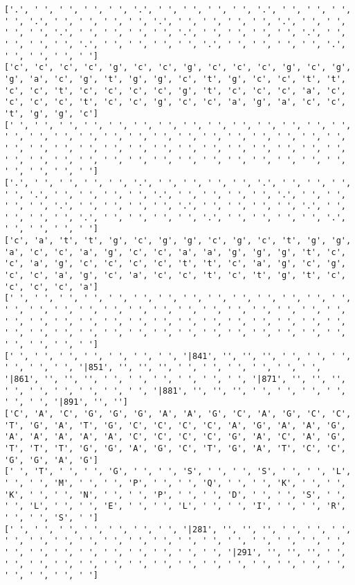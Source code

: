 \documentclass{article}
\begin{document}
\begin{Verbatim}
['.', ' ', ' ', ' ', ' ', '.', ' ', ' ', ' ', ' ', '.', ' ', ' ', ' ', ' ', '.', ' ', ' ', ' ', ' ', '.', ' ', ' ', ' ', ' ', '.', ' ', ' ', ' ', ' ', '.', ' ', ' ', ' ', ' ', '.', ' ', ' ', ' ', ' ', '.', ' ', ' ', ' ', ' ', '.', ' ', ' ', ' ', ' ', '.', ' ', ' ', ' ', ' ', '.', ' ', ' ', ' ', ' ']
['c', 'c', 'c', 'c', 'g', 'c', 'c', 'g', 'c', 'c', 'c', 'g', 'c', 'g', 'g', 'a', 'c', 'g', 't', 'g', 'g', 'c', 't', 'g', 'c', 'c', 't', 't', 'c', 'c', 't', 'c', 'c', 'c', 'c', 'g', 't', 'c', 'c', 'c', 'a', 'c', 'c', 'c', 'c', 't', 'c', 'c', 'g', 'c', 'c', 'a', 'g', 'a', 'c', 'c', 't', 'g', 'g', 'c']
[' ', ' ', ' ', ' ', ' ', ' ', ' ', ' ', ' ', ' ', ' ', ' ', ' ', ' ', ' ', ' ', ' ', ' ', ' ', ' ', ' ', ' ', ' ', ' ', ' ', ' ', ' ', ' ', ' ', ' ', ' ', ' ', ' ', ' ', ' ', ' ', ' ', ' ', ' ', ' ', ' ', ' ', ' ', ' ', ' ', ' ', ' ', ' ', ' ', ' ', ' ', ' ', ' ', ' ', ' ', ' ', ' ', ' ', ' ', ' ']
['.', ' ', ' ', ' ', ' ', '.', ' ', ' ', ' ', ' ', '.', ' ', ' ', ' ', ' ', '.', ' ', ' ', ' ', ' ', '.', ' ', ' ', ' ', ' ', '.', ' ', ' ', ' ', ' ', '.', ' ', ' ', ' ', ' ', '.', ' ', ' ', ' ', ' ', '.', ' ', ' ', ' ', ' ', '.', ' ', ' ', ' ', ' ', '.', ' ', ' ', ' ', ' ', '.', ' ', ' ', ' ', ' ']
['c', 'a', 't', 't', 'g', 'c', 'g', 'g', 'c', 'g', 'c', 't', 'g', 'g', 'a', 'c', 'c', 'a', 'g', 'c', 'c', 'a', 'a', 'g', 'g', 'g', 't', 'c', 'c', 'a', 'g', 'c', 'c', 'c', 'c', 't', 't', 'c', 'a', 'g', 'c', 'g', 'c', 'c', 'a', 'g', 'c', 'a', 'c', 'c', 't', 'c', 't', 'g', 't', 'c', 'c', 'c', 'c', 'a']
[' ', ' ', ' ', ' ', ' ', ' ', ' ', ' ', ' ', ' ', ' ', ' ', ' ', ' ', ' ', ' ', ' ', ' ', ' ', ' ', ' ', ' ', ' ', ' ', ' ', ' ', ' ', ' ', ' ', ' ', ' ', ' ', ' ', ' ', ' ', ' ', ' ', ' ', ' ', ' ', ' ', ' ', ' ', ' ', ' ', ' ', ' ', ' ', ' ', ' ', ' ', ' ', ' ', ' ', ' ', ' ', ' ', ' ', ' ', ' ']
[' ', ' ', ' ', ' ', ' ', ' ', ' ', '|841', '', '', '', ' ', ' ', ' ', ' ', ' ', ' ', '|851', '', '', '', ' ', ' ', ' ', ' ', ' ', ' ', '|861', '', '', '', ' ', ' ', ' ', ' ', ' ', ' ', '|871', '', '', '', ' ', ' ', ' ', ' ', ' ', ' ', '|881', '', '', '', ' ', ' ', ' ', ' ', ' ', ' ', '|891', '', '']
['C', 'A', 'C', 'G', 'G', 'G', 'A', 'A', 'G', 'C', 'A', 'G', 'C', 'C', 'T', 'G', 'A', 'T', 'G', 'C', 'C', 'C', 'C', 'A', 'G', 'A', 'A', 'G', 'A', 'A', 'A', 'A', 'A', 'C', 'C', 'C', 'C', 'G', 'A', 'C', 'A', 'G', 'T', 'T', 'T', 'G', 'G', 'A', 'G', 'C', 'T', 'G', 'A', 'T', 'C', 'C', 'G', 'G', 'A', 'G']
[' ', 'T', ' ', ' ', 'G', ' ', ' ', 'S', ' ', ' ', 'S', ' ', ' ', 'L', ' ', ' ', 'M', ' ', ' ', 'P', ' ', ' ', 'Q', ' ', ' ', 'K', ' ', ' ', 'K', ' ', ' ', 'N', ' ', ' ', 'P', ' ', ' ', 'D', ' ', ' ', 'S', ' ', ' ', 'L', ' ', ' ', 'E', ' ', ' ', 'L', ' ', ' ', 'I', ' ', ' ', 'R', ' ', ' ', 'S', ' ']
[' ', ' ', ' ', ' ', ' ', ' ', ' ', '|281', '', '', '', ' ', ' ', ' ', ' ', ' ', ' ', ' ', ' ', ' ', ' ', ' ', ' ', ' ', ' ', ' ', ' ', ' ', ' ', ' ', ' ', ' ', ' ', ' ', ' ', ' ', ' ', '|291', '', '', '', ' ', ' ', ' ', ' ', ' ', ' ', ' ', ' ', ' ', ' ', ' ', ' ', ' ', ' ', ' ', ' ', ' ', ' ', ' ']
  

\end{Verbatim}
\end{document}
